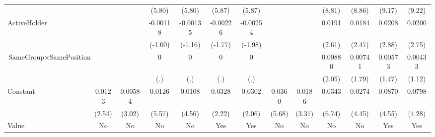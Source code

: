 {\begin{tabular}{l*{12}{c}}
                    &                     &                     &      (5.80)         &      (5.80)         &      (5.87)         &      (5.87)         &                     &                     &      (8.81)         &      (8.86)         &      (9.17)         &      (9.22)         \\
[1em]
ActiveHolder        &                     &                     &    -0.00118         &    -0.00135         &    -0.00226         &    -0.00254         &                     &                     &      0.0191\sym{*}  &      0.0184\sym{*}  &      0.0208\sym{**} &      0.0200\sym{**} \\
                    &                     &                     &     (-1.00)         &     (-1.16)         &     (-1.77)         &     (-1.98)         &                     &                     &      (2.61)         &      (2.47)         &      (2.88)         &      (2.75)         \\
[1em]
 $ \text{SameGroup} \times \text{SamePosition} $&                     &                     &           0         &           0         &           0         &           0         &                     &                     &     0.00880\sym{*}  &     0.00741         &     0.00573         &     0.00433         \\
                    &                     &                     &         (.)         &         (.)         &         (.)         &         (.)         &                     &                     &      (2.05)         &      (1.79)         &      (1.47)         &      (1.12)         \\
[1em]
Constant            &      0.0123\sym{*}  &     0.00584\sym{**} &      0.0126\sym{***}&      0.0108\sym{***}&      0.0328\sym{*}  &      0.0302\sym{*}  &      0.0360\sym{***}&      0.0186\sym{**} &      0.0343\sym{***}&      0.0274\sym{***}&      0.0870\sym{***}&      0.0798\sym{***}\\
                    &      (2.54)         &      (3.02)         &      (5.57)         &      (4.56)         &      (2.22)         &      (2.06)         &      (5.68)         &      (3.31)         &      (6.74)         &      (4.45)         &      (4.55)         &      (4.28)         \\
\hline
Value               &          No         &          No         &          No         &          No         &         Yes         &         Yes         &          No         &          No         &          No         &          No         &         Yes         &         Yes         \\

\end{tabular}}
